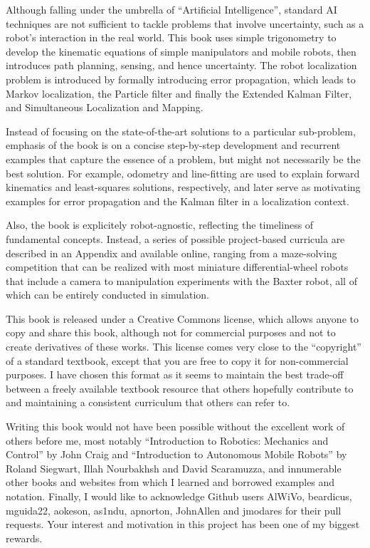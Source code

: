 \documentclass[paper=6.14in:9.21in,pagesize=pdftex,11pt,twoside,openright]{scrbook}
\begin{document}
Although falling under the umbrella of ``Artificial Intelligence'', standard AI techniques are not sufficient to tackle problems that involve uncertainty, such as a robot's interaction in the real world. This book uses simple trigonometry to develop the kinematic equations of simple manipulators and mobile robots, then introduces path planning, sensing, and hence uncertainty. The robot localization problem is introduced by formally introducing error propagation, which leads to Markov localization, the Particle filter and finally the Extended Kalman Filter, and Simultaneous Localization and Mapping. 

Instead of focusing on the state-of-the-art solutions to a particular sub-problem, emphasis of the book is on a concise step-by-step development and recurrent examples that capture the essence of a problem, but might not necessarily be the best solution. For example, odometry and line-fitting are used to explain forward kinematics and least-squares solutions, respectively, and later serve as motivating examples for error propagation and the Kalman filter in a localization context.

Also, the book is explicitely robot-agnostic, reflecting the timeliness of fundamental concepts. Instead, a series of possible project-based curricula are described in an Appendix and available online, ranging from a maze-solving competition that can be realized with most miniature differential-wheel robots that include a camera to manipulation experiments with the Baxter robot, all of which can be entirely conducted in simulation. 

This book is released under a Creative Commons license, which allows anyone to copy and share this book, although not for commercial purposes and not to create derivatives of these works. This license comes very close to the ``copyright'' of a standard textbook, except that you are free to copy it for non-commercial purposes. I have chosen this format as it seems to maintain the best trade-off between a freely available textbook resource that others hopefully contribute to and maintaining a consistent curriculum that others can refer to.   

Writing this book would not have been possible without the excellent work of others before me, most notably ``Introduction to Robotics: Mechanics and Control'' by John Craig and ``Introduction to Autonomous Mobile Robots'' by Roland Siegwart, Illah Nourbakhsh and David Scaramuzza, and innumerable other books and websites from which I learned and borrowed examples and notation. Finally, I would like to acknowledge Github users AlWiVo, beardicus, mguida22, aokeson, as1ndu, apnorton, JohnAllen and jmodares for their pull requests. Your interest and motivation in this project has been one of my biggest rewards.  
\end{document}
